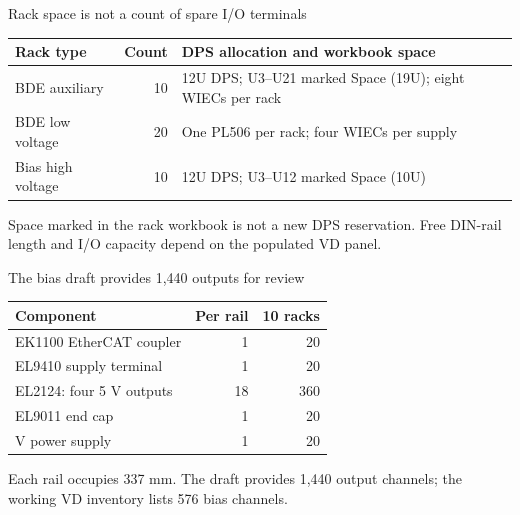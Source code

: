 \begin{frame}{Rack space is not a count of spare I/O terminals}
  \renewcommand{\arraystretch}{1.4}
  \begin{tabularx}{\textwidth}{@{}>{\RaggedRight\arraybackslash}p{3.4cm}r>{\RaggedRight\arraybackslash}X@{}}
    \toprule
    \textbf{Rack type} & \textbf{Count} & \textbf{DPS allocation and workbook space}\\
    \midrule
    BDE auxiliary & 10 & 12U DPS; U3--U21 marked Space (19U); eight WIECs per rack\\
    BDE low voltage & 20 & One PL506 per rack; four WIECs per supply\\
    Bias high voltage & 10 & 12U DPS; U3--U12 marked Space (10U)\\
    \bottomrule
  \end{tabularx}\par
  \bigskip
  Space marked in the rack workbook is not a new DPS reservation.
  Free DIN-rail length and I/O capacity depend on the populated VD panel.
\end{frame}

\begin{frame}{The bias draft provides 1,440 outputs for review}
  \renewcommand{\arraystretch}{1.3}
  \begin{tabularx}{\textwidth}{@{}>{\RaggedRight\arraybackslash}Xrr@{}}
    \toprule
    \textbf{Component} & \textbf{Per rail} & \textbf{10 racks}\\
    \midrule
    EK1100 EtherCAT coupler & 1 & 20\\
    EL9410 supply terminal & 1 & 20\\
    EL2124: four 5 V outputs & 18 & 360\\
    EL9011 end cap & 1 & 20\\
    24 V power supply & 1 & 20\\
    \bottomrule
  \end{tabularx}\par
  \medskip
  Each rail occupies 337 mm. The draft provides 1,440 output channels;
  the working VD inventory lists 576 bias channels.\par
\end{frame}

